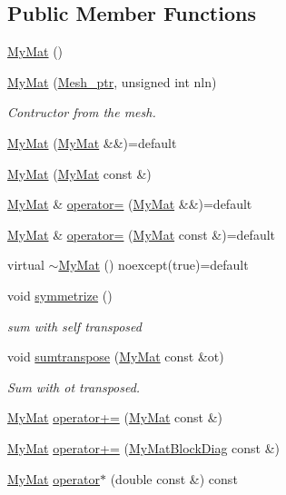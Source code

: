 \subsection*{Public Member Functions}
\begin{DoxyCompactItemize}
\item 
\hyperlink{classTspeed_1_1MyMat_a8fbd3586cb4653ea3cdb2b9d42428e85}{My\-Mat} ()
\item 
\hyperlink{classTspeed_1_1MyMat_a4f07d60d8010d796e27fb90c367b1c8a}{My\-Mat} (\hyperlink{namespaceTspeed_a7367a01365c4cc2c1a09305b3effc4e8}{Mesh\-\_\-ptr}, unsigned int nln)
\begin{DoxyCompactList}\small\item\em Contructor from the mesh. \end{DoxyCompactList}\item 
\hyperlink{classTspeed_1_1MyMat_adc35adc0df81f0be813200c96c294bdc}{My\-Mat} (\hyperlink{classTspeed_1_1MyMat}{My\-Mat} \&\&)=default
\item 
\hyperlink{classTspeed_1_1MyMat_af0996d6425e454b7afb2e5f27c6b77be}{My\-Mat} (\hyperlink{classTspeed_1_1MyMat}{My\-Mat} const \&)
\item 
\hyperlink{classTspeed_1_1MyMat}{My\-Mat} \& \hyperlink{classTspeed_1_1MyMat_a1c595cc39c627f9556f7b2a3548f3da8}{operator=} (\hyperlink{classTspeed_1_1MyMat}{My\-Mat} \&\&)=default
\item 
\hyperlink{classTspeed_1_1MyMat}{My\-Mat} \& \hyperlink{classTspeed_1_1MyMat_ad9a206ca7e833b341c58424e3096641c}{operator=} (\hyperlink{classTspeed_1_1MyMat}{My\-Mat} const \&)=default
\item 
virtual \hyperlink{classTspeed_1_1MyMat_a3b10142286aebdd62af6c38eef9790e5}{$\sim$\-My\-Mat} () noexcept(true)=default
\item 
void \hyperlink{classTspeed_1_1MyMat_a32eb1340d490fc050d6c6f22a0c84a29}{symmetrize} ()
\begin{DoxyCompactList}\small\item\em sum with self transposed \end{DoxyCompactList}\item 
void \hyperlink{classTspeed_1_1MyMat_a89db701286ebcd96e6ae545fa719c6e9}{sumtranspose} (\hyperlink{classTspeed_1_1MyMat}{My\-Mat} const \&ot)
\begin{DoxyCompactList}\small\item\em Sum with ot transposed. \end{DoxyCompactList}\item 
\hyperlink{classTspeed_1_1MyMat}{My\-Mat} \hyperlink{classTspeed_1_1MyMat_aa9b048f523b8f2887ce3a2d578cab6b3}{operator+=} (\hyperlink{classTspeed_1_1MyMat}{My\-Mat} const \&)
\item 
\hyperlink{classTspeed_1_1MyMat}{My\-Mat} \hyperlink{classTspeed_1_1MyMat_a523a402aa8afdb2b270413b8796b0b5f}{operator+=} (\hyperlink{classTspeed_1_1MyMatBlockDiag}{My\-Mat\-Block\-Diag} const \&)
\item 
\hyperlink{classTspeed_1_1MyMat}{My\-Mat} \hyperlink{classTspeed_1_1MyMat_a8aa3f178e8723a2ac133e3debe0f4655}{operator$\ast$} (double const \&) const 
\end{DoxyCompactItemize}
